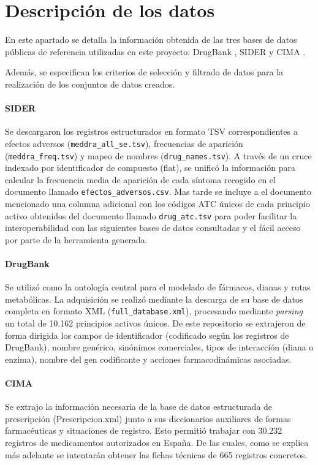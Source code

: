 \section{Descripción de los datos}
En este apartado se detalla la información obtenida de las tres bases de datos públicas de referencia utilizadas en este proyecto: DrugBank \cite{drugbank}, SIDER \cite{sider} y CIMA \cite{cima}.

Además, se especifican los criterios de selección y filtrado de datos para la realización de los conjuntos de datos creados.

\paragraph{SIDER}
Se descargaron los registros estructurados en formato TSV correspondientes a efectos adversos (\texttt{meddra\_all\_se.tsv}), frecuencias de aparición (\texttt{meddra\_freq.tsv}) y mapeo de nombres (\texttt{drug\_names.tsv}). A través de un cruce indexado por identificador de compuesto (flat), se unificó la información para calcular la frecuencia media de aparición de cada síntoma recogido en el documento llamado \texttt{efectos\_adversos.csv}.
Mas tarde se incluye a el documento mencionado una columna adicional con los códigos ATC únicos de cada principio activo obtenidos del documento llamado \texttt{drug\_atc.tsv} para poder facilitar la interoperabilidad con las siguientes bases de datos consultadas y el fácil acceso por parte de la herramienta generada.

\paragraph{DrugBank}
Se utilizó como la ontología central para el modelado de fármacos, dianas y rutas metabólicas. La adquisición se realizó mediante la descarga de su base de datos completa en formato XML (\texttt{full\_database.xml}), procesando mediante \textit{parsing} un total de 10.162 principios activos únicos. De este repositorio se extrajeron de forma dirigida los campos de identificador (codificado según los registros de DrugBank), nombre genérico, sinónimos comerciales, tipos de interacción (diana o enzima), nombre del gen codificante y acciones farmacodinámicas asociadas.

\paragraph{CIMA}
Se extrajo la información necesaria de la base de datos estructurada de prescripción (Prescripcion.xml) junto a sus diccionarios auxiliares de formas farmacéuticas y situaciones de registro. Esto permitió trabajar con 30.232 registros de medicamentos autorizados en España. De las cuales, como se explica más adelante se intentarán obtener las fichas técnicas de 665 registros concretos.

